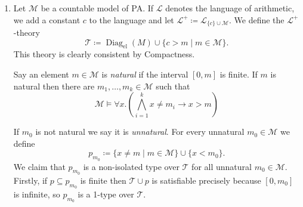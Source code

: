 \documentclass{article}
\theoremstyle{theorem}
\DeclareMathOperator{\Diag}{Diag}
\begin{document}
\begin{enumerate}[leftmargin=*]
		\item Let $\mathcal{M}$ be a countable model of PA. If $\mathcal{L}$ denotes the language of arithmetic, we add a constant $c$ to the language and let $\mathcal{L}^+ \coloneqq \mathcal{L}_{\{c\}\cup \mathcal{M}}$. We define the $\mathcal{L}^+$-theory
		\[
			\mathcal{T} \coloneqq \Diag_{\text{el}}(M) \cup \{c > m \mid m\in \mathcal{M}\}.
		\]
		This theory is clearly consistent by Compactness. 
		
		Say an element $m\in \mathcal{M}$ is \emph{natural} if the interval $[0,m]$ is finite. If $m$ is natural then there are $m_1,\ldots,m_k\in \mathcal{M}$ such that
		\[
			\mathcal{M} \models \forall x. \left(\bigwedge_{i=1}^k x \neq m_i \rightarrow x > m\right)
		\]
		
		If $m_0$ is not natural we say it is \emph{unnatural}. For every unnatural $m_0\in \mathcal{M}$ we define 
		\[
			p_{m_0} \coloneqq \{x \neq  m \mid m\in \mathcal{M}\} \cup\{x < m_0\}.
		\]
		We claim that $p_{m_0}$ is a non-isolated type over $\mathcal{T}$ for all unnatural $m_0\in\mathcal{M}$. Firstly, if $p\subseteq p_{m_0}$ is finite then $\mathcal{T}\cup p$ is satisfiable precisely because $[0,m_0]$ is infinite, so $p_{m_0}$ is a 1-type over $\mathcal{T}$. 
		

\end{enumerate}
\end{document}
